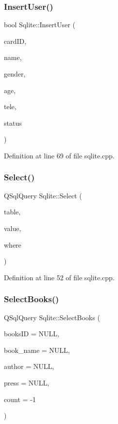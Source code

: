 \subsubsection{\texorpdfstring{InsertUser()}{InsertUser()}}
{\footnotesize\ttfamily bool Sqlite\+::\+Insert\+User (\begin{DoxyParamCaption}\item[{Q\+String}]{card\+ID,  }\item[{Q\+String}]{name,  }\item[{Q\+String}]{gender,  }\item[{int}]{age,  }\item[{Q\+String}]{tele,  }\item[{bool}]{status }\end{DoxyParamCaption})}



Definition at line 69 of file sqlite.\+cpp.

\mbox{\label{class_sqlite_a9a39cca147a504c82e98261707aa1e8d}} 
\subsubsection{\texorpdfstring{Select()}{Select()}}
{\footnotesize\ttfamily Q\+Sql\+Query Sqlite\+::\+Select (\begin{DoxyParamCaption}\item[{Q\+String}]{table,  }\item[{Q\+String}]{value,  }\item[{Q\+String}]{where }\end{DoxyParamCaption})}



Definition at line 52 of file sqlite.\+cpp.

\mbox{\label{class_sqlite_a045a181307b20222cd5a6c6f5f428281}} 
\subsubsection{\texorpdfstring{SelectBooks()}{SelectBooks()}}
{\footnotesize\ttfamily Q\+Sql\+Query Sqlite\+::\+Select\+Books (\begin{DoxyParamCaption}\item[{Q\+String}]{books\+ID = {\ttfamily NULL},  }\item[{Q\+String}]{book\+\_\+name = {\ttfamily NULL},  }\item[{Q\+String}]{author = {\ttfamily NULL},  }\item[{Q\+String}]{press = {\ttfamily NULL},  }\item[{int}]{count = {\ttfamily -\/1} }\end{DoxyParamCaption})}



